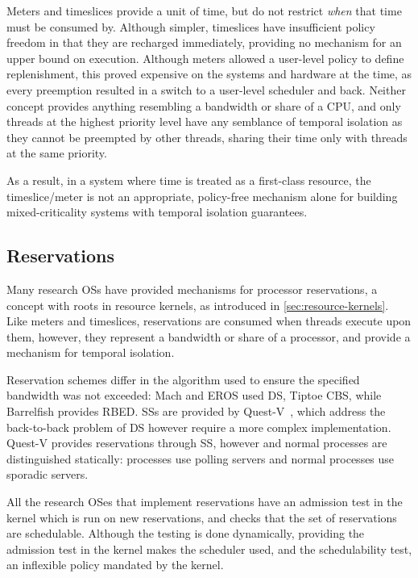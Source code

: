 Meters and timeslices provide a unit of time, but do not restrict \emph{when} that time must be consumed
by. Although simpler, timeslices have insufficient policy freedom in that they are recharged immediately,
providing no mechanism for an upper bound on execution. Although meters allowed a user-level policy 
to define replenishment, this proved expensive on the systems and hardware at the time, as every
preemption resulted in a switch to a user-level scheduler and back. Neither concept provides
anything resembling a bandwidth or share of a CPU, and only threads at the highest priority level
have any semblance of temporal isolation as they cannot be preempted by other threads, sharing their
time only with threads at the same priority.

As a result, in a system where time is treated as a first-class resource,
the timeslice/meter is not an appropriate, policy-free mechanism alone for building mixed-criticality
systems with temporal isolation guarantees.

\subsection{Reservations}

Many research \glspl{OS} have provided mechanisms for processor reservations, a concept with roots
in resource kernels, as introduced in \cref{sec:resource-kernels}. Like meters and timeslices,
reservations are consumed when threads execute upon them, however, they represent a bandwidth or
share of a processor, and provide a mechanism for temporal isolation.

Reservation schemes differ in the algorithm used to ensure the specified bandwidth was not
exceeded: Mach and EROS used \gls{DS}, Tiptoe \gls{CBS}, while Barrelfish provides \gls{RBED}. 
\Glspl{SS} are provided by Quest-V~\citep{Li_WCM_14}, which address the back-to-back
problem of \gls{DS} however require a more complex implementation.
Quest-V provides reservations through \gls{SS}, however \IO and normal processes
are distinguished statically: \IO processes use polling servers and normal processes use sporadic
servers. 

All the research OSes that implement reservations have an admission
test in the kernel which is run on new reservations, and checks that the set of reservations are
schedulable. Although the testing is done dynamically, providing the admission test in the kernel makes the scheduler used, and the
schedulability test, an inflexible policy mandated by the kernel. 

